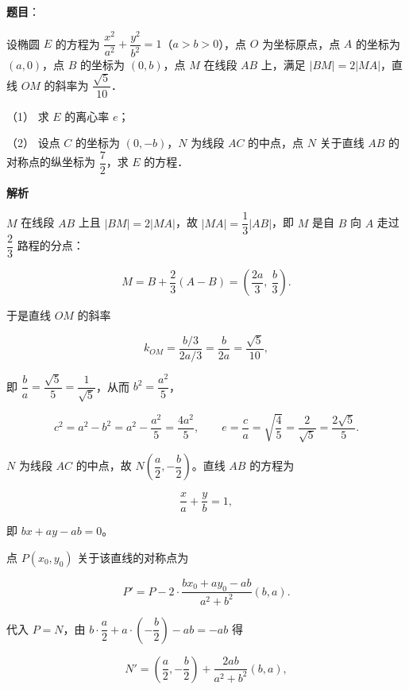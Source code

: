 \begin{answer}

\textbf{题目}：

设椭圆 \(E\) 的方程为 \(\dfrac{x^2}{a^2}+\dfrac{y^2}{b^2}=1\)（\(a>b>0\)），点 \(O\) 为坐标原点，点 \(A\) 的坐标为 \((a,0)\)，点 \(B\) 的坐标为 \((0,b)\)，点 \(M\) 在线段 \(AB\) 上，满足 \(|BM|=2|MA|\)，直线 \(OM\) 的斜率为 \(\dfrac{\sqrt{5}}{10}\)．

（1） 求 \(E\) 的离心率 \(e\)；

（2） 设点 \(C\) 的坐标为 \((0,-b)\)，\(N\) 为线段 \(AC\) 的中点，点 \(N\) 关于直线 \(AB\) 的对称点的纵坐标为 \(\dfrac{7}{2}\)，求 \(E\) 的方程．

\textbf{解析}


\(M\) 在线段 \(AB\) 上且 \(|BM|=2|MA|\)，故 \(|MA|=\dfrac{1}{3}|AB|\)，即 \(M\) 是自 \(B\) 向 \(A\) 走过 \(\dfrac{2}{3}\) 路程的分点：

\nopagebreak[4]
\[
M=B+\dfrac{2}{3}(A-B)=\left(\dfrac{2a}{3},\ \dfrac{b}{3}\right).
\]

于是直线 \(OM\) 的斜率

\nopagebreak[4]
\[
k_{OM}=\dfrac{b/3}{2a/3}=\dfrac{b}{2a}=\dfrac{\sqrt{5}}{10},
\]

即 \(\dfrac{b}{a}=\dfrac{\sqrt{5}}{5}=\dfrac{1}{\sqrt{5}}\)，从而 \(b^2=\dfrac{a^2}{5}\)，

\nopagebreak[4]
\[
c^2=a^2-b^2=a^2-\dfrac{a^2}{5}=\dfrac{4a^2}{5},\qquad
e=\dfrac{c}{a}=\sqrt{\dfrac{4}{5}}=\dfrac{2}{\sqrt{5}}=\dfrac{2\sqrt{5}}{5}.
\]


\(N\) 为线段 \(AC\) 的中点，故 \(N\left(\dfrac{a}{2},-\dfrac{b}{2}\right)\)。直线 \(AB\) 的方程为

\nopagebreak[4]
\[
\dfrac{x}{a}+\dfrac{y}{b}=1,
\]

即 \(bx+ay-ab=0\)。

点 \(P(x_0,y_0)\) 关于该直线的对称点为

\nopagebreak[4]
\[
P'=P-2\cdot\dfrac{bx_0+ay_0-ab}{a^2+b^2}(b,a).
\]

代入 \(P=N\)，由 \(b\cdot\dfrac{a}{2}+a\cdot\left(-\dfrac{b}{2}\right)-ab=-ab\) 得

\nopagebreak[4]
\[
N'=\left(\dfrac{a}{2},-\dfrac{b}{2}\right)+\dfrac{2ab}{a^2+b^2}(b,a),
\]


\end{answer}

